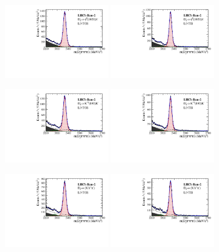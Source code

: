 \begin{figure}[h]
\centering
\includegraphics[height=!,width=0.4\textwidth]{figs/MassFit/norm_Run2_phipi_t0.pdf}
\includegraphics[height=!,width=0.4\textwidth]{figs/MassFit/norm_Run2_phipi_t1.pdf}

\includegraphics[height=!,width=0.4\textwidth]{figs/MassFit/norm_Run2_KsK_t0.pdf}
\includegraphics[height=!,width=0.4\textwidth]{figs/MassFit/norm_Run2_KsK_t1.pdf}

\includegraphics[height=!,width=0.4\textwidth]{figs/MassFit/norm_Run2_KKpi_NR_t0.pdf}
\includegraphics[height=!,width=0.4\textwidth]{figs/MassFit/norm_Run2_KKpi_NR_t1.pdf}


\end{figure}
